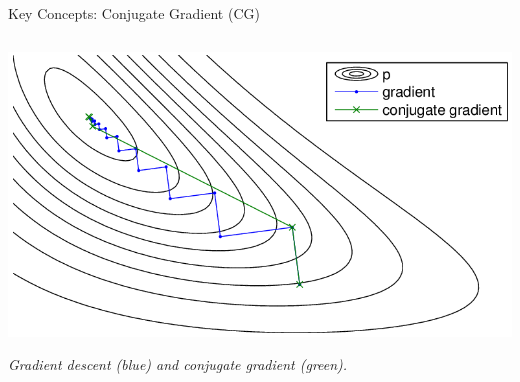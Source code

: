 \documentclass[aspectratio=169,xcolor=dvipsnames]{beamer}
\begin{document}
\begin{frame}{Key Concepts: Conjugate Gradient (CG)}
\begin{columns}[c]
\begin{column}{0.5\textwidth}
\begin{center}
    \includegraphics[width=\linewidth]{CG.png}
    
    \vspace{0.2cm}
    
    \tiny \textit{Gradient descent (blue) and conjugate gradient (green).}
\end{center}

\end{column}

\end{columns}

\end{frame}
\end{document}
